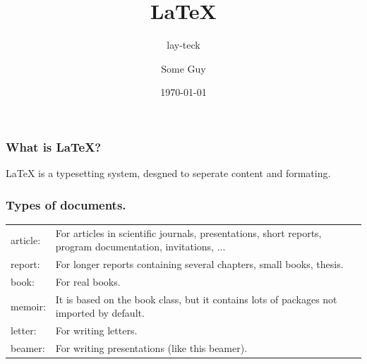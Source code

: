 \documentclass{beamer}
\title{\LaTeX}
\subtitle{lay-teck}
\author{Some Guy}
\institute{Linux@APP}
\date{\today}
\begin{document}
\frame{\titlepage}
\begin{frame}
\frametitle{What is \LaTeX?}
LaTeX is a typesetting system, desgned to seperate content and formating.
\end{frame}
\begin{frame}[fragile]
\frametitle{Types of documents.}
\renewcommand*{\arraystretch}{1.4}
\begin{longtable}{l p{3 in}}
article: &     For articles in scientific journals, presentations, short reports, program documentation, invitations, ... \\
report: &      For longer reports containing several chapters, small books, thesis. \\
book: &        For real books. \\
memoir: &      It is based on the book class, but it contains lots of packages not imported by default. \\
letter: &      For writing letters. \\
beamer: &      For writing presentations (like this beamer). \\
\end{longtable}
\end{frame}
\end{document}
